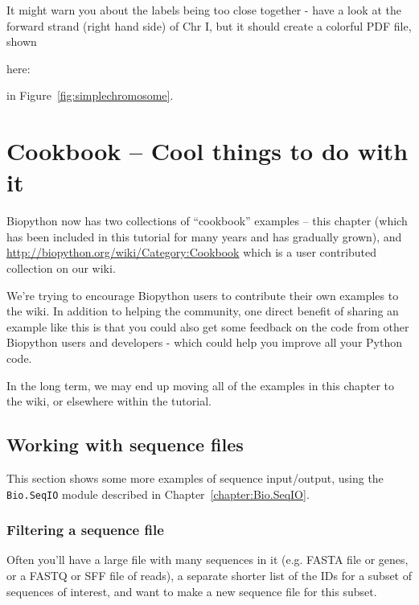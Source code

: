 \documentclass{report}
\begin{document}
It might warn you about the labels being too close together - have a look
at the forward strand (right hand side) of Chr I, but it should create a
colorful PDF file, shown
\begin{htmlonly}
here:


\end{htmlonly}
\begin{latexonly}
in Figure~\ref{fig:simplechromosome}.
\end{latexonly}

\chapter{Cookbook -- Cool things to do with it}
\label{chapter:cookbook}

Biopython now has two collections of ``cookbook'' examples -- this chapter
(which has been included in this tutorial for many years and has gradually
grown), and \url{http://biopython.org/wiki/Category:Cookbook} which is a
user contributed collection on our wiki.

We're trying to encourage Biopython users to contribute their own examples
to the wiki. In addition to helping the community, one direct benefit of
sharing an example like this is that you could also get some feedback on
the code from other Biopython users and developers - which could help you
improve all your Python code.

In the long term, we may end up moving all of the examples in this chapter
to the wiki, or elsewhere within the tutorial.

\section{Working with sequence files}
\label{seq:cookbook-sequences}

This section shows some more examples of sequence input/output, using the
\verb|Bio.SeqIO| module described in Chapter~\ref{chapter:Bio.SeqIO}.

\subsection{Filtering a sequence file}

Often you'll have a large file with many sequences in it (e.g. FASTA file
or genes, or a FASTQ or SFF file of reads), a separate shorter list of
the IDs for a subset of sequences of interest, and want to make a new
sequence file for this subset.
\end{document}
